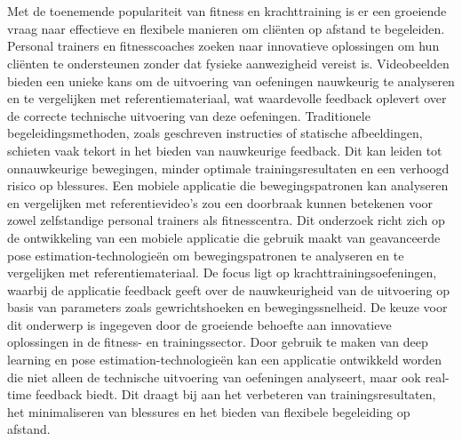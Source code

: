 
\chapter{}%
\label{ch:inleiding}

Met de toenemende populariteit van fitness en krachttraining is er een groeiende vraag naar effectieve en flexibele manieren om cliënten op afstand te begeleiden. Personal trainers en fitnesscoaches zoeken naar innovatieve oplossingen om hun cliënten te ondersteunen zonder dat fysieke aanwezigheid vereist is. Videobeelden bieden een unieke kans om de uitvoering van oefeningen nauwkeurig te analyseren en te vergelijken met referentiemateriaal, wat waardevolle feedback oplevert over de correcte technische uitvoering van deze oefeningen.
\medskip
Traditionele begeleidingsmethoden, zoals geschreven instructies of statische afbeeldingen, schieten vaak tekort in het bieden van nauwkeurige feedback. Dit kan leiden tot onnauwkeurige bewegingen, minder optimale trainingsresultaten en een verhoogd risico op blessures. Een mobiele applicatie die bewegingspatronen kan analyseren en vergelijken met referentievideo’s zou een doorbraak kunnen betekenen voor zowel zelfstandige personal trainers als fitnesscentra.
\medskip
Dit onderzoek richt zich op de ontwikkeling van een mobiele applicatie die gebruik maakt van geavanceerde pose estimation-technologieën om bewegingspatronen te analyseren en te vergelijken met referentiemateriaal. De focus ligt op krachttrainingsoefeningen, waarbij de applicatie feedback geeft over de nauwkeurigheid van de uitvoering op basis van parameters zoals gewrichtshoeken en bewegingssnelheid.
\medskip
De keuze voor dit onderwerp is ingegeven door de groeiende behoefte aan innovatieve oplossingen in de fitness- en trainingssector. Door gebruik te maken van deep learning en pose estimation-technologieën kan een applicatie ontwikkeld worden die niet alleen de technische uitvoering van oefeningen analyseert, maar ook real-time feedback biedt. Dit draagt bij aan het verbeteren van trainingsresultaten, het minimaliseren van blessures en het bieden van flexibele begeleiding op afstand.
\medskip

\section{}%
\label{sec:probleemstelling}

